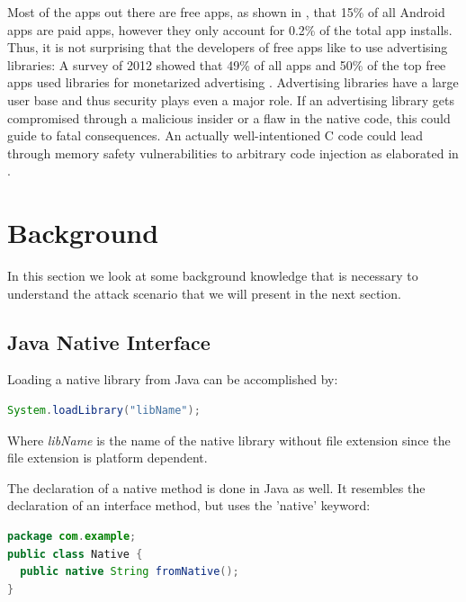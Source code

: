 Most of the apps out there are free apps, as shown in \cite[p. 164]{Wang:2017:ESM:3038912.3052712}, that 15\% of all Android apps are paid apps, however they only account for 0.2\% of the total app installs. 
Thus, it is not surprising that the developers of free apps like to use advertising libraries: A survey of 2012 showed that 49\% of all apps and 50\% of the top free apps used libraries for monetarized advertising \cite[p.7]{Pearce:2012:APS:2414456.2414498}. 
Advertising libraries have a large user base and thus security plays even a major role. 
If an advertising library gets compromised through a malicious insider or a flaw in the native code, this could guide to fatal consequences. 
An actually well-intentioned C code could lead through memory safety vulnerabilities to arbitrary code injection as elaborated in \cite{Szekeres:2013:SEW:2497621.2498101}.

\section{Background}

In this section we look at some background knowledge that is necessary to understand the attack scenario that we will present in the next section.
 
\subsection{Java Native Interface}

Loading a native library from Java can be accomplished by:
\begin{lstlisting}[language=Java, style=JavaCodeStyle, caption=Loading a native libary]
 System.loadLibrary("libName");
\end{lstlisting}
Where \emph{libName} is the name of the native library without file extension since the file extension is platform dependent.

The declaration of a native method is done in Java as well. It resembles the declaration of an interface method, but uses the 'native' keyword:
\begin{lstlisting}[language=Java, style=JavaCodeStyle, caption= native declaration]
package com.example;
public class Native {
  public native String fromNative();
}
\end{lstlisting}

